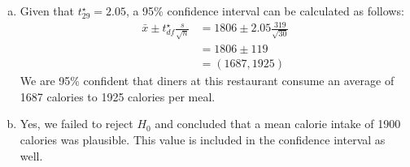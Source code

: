{{\begin{enumerate}[(a)]
\begin{align*}
0.10 &< p-value < 0.20
\end{align*}
Since p-value $>$ 0.05, we fail to reject $H_0$. The data do not provide strong evidence of a significant change in the average calorie intake of diners at this restaurant.
\item Given that $t_{29}^\star = 2.05$, a 95\% confidence interval can be calculated as follows:
\begin{align*}
\bar{x} \pm t_{df}^\star \frac{s}{\sqrt{n}} &= 1806 \pm 2.05 \frac{319}{\sqrt{30}} \\
&= 1806 \pm 119 \\
&= (1687, 1925)
\end{align*}
We are 95\% confident that diners at this restaurant consume an average of 1687 calories to 1925 calories per meal.
\item Yes, we failed to reject $H_0$ and concluded that a mean calorie intake of 1900 calories was plausible. This value is included in the confidence interval as well.
\end{enumerate}
}
}


